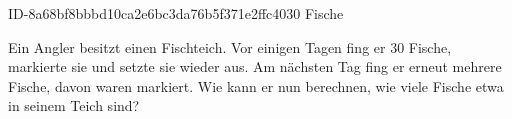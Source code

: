 \begin{exercise}
      {ID-8a68bf8bbbd10ca2e6bc3da76b5f371e2ffc4030}
      {Fische}
  \ifproblem\problem\par
    Ein Angler besitzt einen Fischteich. Vor einigen Tagen fing er 30 Fische,
    markierte sie und setzte sie wieder aus. Am nächsten Tag fing er erneut
    mehrere Fische, davon waren  markiert. Wie kann er nun berechnen,
    wie viele Fische etwa in seinem Teich sind?
  \fi
\end{exercise}
